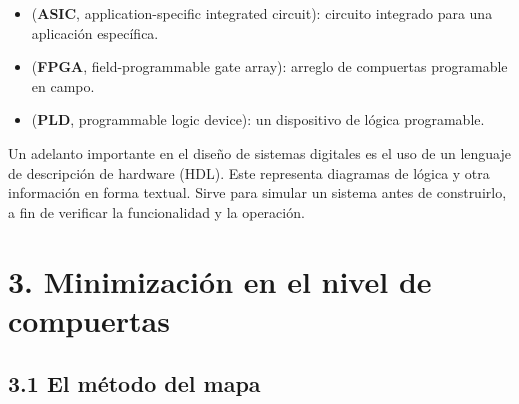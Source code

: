 \documentclass{article}
\begin{document}
\begin{itemize}
    \item (\textbf{ASIC}, application-specific integrated circuit): circuito integrado para una aplicaci\'{o}n espec\'{i}fica.
    \item (\textbf{FPGA}, field-programmable gate array): arreglo de compuertas programable en campo.
    \item (\textbf{PLD}, programmable logic device): un dispositivo de l\'{o}gica programable.
\end{itemize}

Un adelanto importante en el dise\~{n}o de sistemas digitales es el uso de un lenguaje de descripci\'{o}n
de hardware (HDL). Este representa diagramas de l\'{o}gica y otra informaci\'{o}n en forma textual. Sirve
para simular un sistema antes de construirlo, a fin de verificar la funcionalidad y la operaci\'{o}n.
\newpage

\section*{3. Minimizaci\'{o}n en el nivel de compuertas}
\subsection*{3.1 El m\'{e}todo del mapa}
\end{document}
